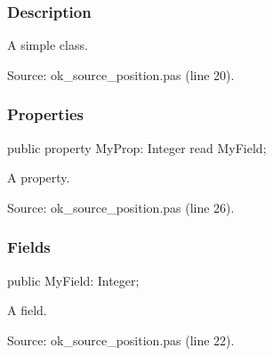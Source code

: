 \documentclass{report}
\newif\ifpdf
\begin{document}
\subsubsection*{\large{\textbf{Description}}\normalsize\hspace{1ex}\hfill}
A simple class.\par
Source: ok{\_}source{\_}position.pas (line 20).\subsubsection*{\large{\textbf{Properties}}\normalsize\hspace{1ex}\hfill}
\begin{list}{}{
\setlength{\itemindent}{0cm}
\setlength{\listparindent}{0cm}
\setlength{\leftmargin}{\evensidemargin}
\addtolength{\leftmargin}{\tmplength}
\settowidth{\labelsep}{X}
\addtolength{\leftmargin}{\labelsep}
\setlength{\labelwidth}{\tmplength}
}
\label{ok_source_position.TMyClass-MyProp}
\item[\textbf{MyProp}\hfill]
\ifpdf
\begin{flushleft}
\fi
\begin{ttfamily}
public property MyProp: Integer read MyField;\end{ttfamily}

\ifpdf
\end{flushleft}
\fi


\par A property.\par
Source: ok{\_}source{\_}position.pas (line 26).\end{list}
\subsubsection*{\large{\textbf{Fields}}\normalsize\hspace{1ex}\hfill}
\begin{list}{}{
\setlength{\itemindent}{0cm}
\setlength{\listparindent}{0cm}
\setlength{\leftmargin}{\evensidemargin}
\addtolength{\leftmargin}{\tmplength}
\settowidth{\labelsep}{X}
\addtolength{\leftmargin}{\labelsep}
\setlength{\labelwidth}{\tmplength}
}
\label{ok_source_position.TMyClass-MyField}
\item[\textbf{MyField}\hfill]
\ifpdf
\begin{flushleft}
\fi
\begin{ttfamily}
public MyField: Integer;\end{ttfamily}

\ifpdf
\end{flushleft}
\fi


\par A field.\par
Source: ok{\_}source{\_}position.pas (line 22).\end{list}
\end{document}
